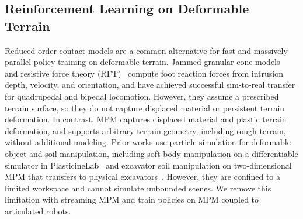 \subsection{Reinforcement Learning on Deformable Terrain}
Reduced-order contact models are a common alternative for fast and massively parallel policy training on deformable terrain.
Jammed granular cone models~\cite{choi,luo2025mild} and resistive force theory (RFT)~\cite{rft,agarwal2023rft3d,gmloco} compute foot reaction forces from intrusion depth, velocity, and orientation, and have achieved successful sim-to-real transfer for quadrupedal and bipedal locomotion.
However, they assume a prescribed terrain surface, so they do not capture displaced material or persistent terrain deformation.
In contrast, MPM captures displaced material and plastic terrain deformation, and supports arbitrary terrain geometry, including rough terrain, without additional modeling.
Prior works use particle simulation for deformable object and soil manipulation, including soft-body manipulation on a differentiable simulator in PlasticineLab~\cite{plasticine} and excavator soil manipulation on two-dimensional MPM that transfers to physical excavators~\cite{werner2026materialstate}.
However, they are confined to a limited workspace and cannot simulate unbounded scenes.
We remove this limitation with streaming MPM and train policies on MPM coupled to articulated robots.

